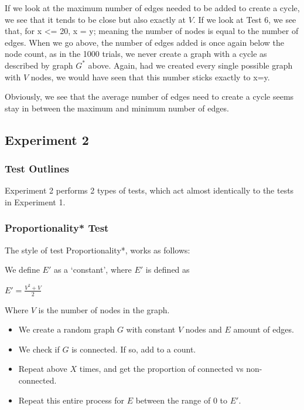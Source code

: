 \documentclass[12pt]{article}
\begin{document}
If we look at the maximum number of edges needed to be added to create a cycle, we see that it tends to be close but also exactly at $V$. If we look at Test 6, we see that, for x <= 20, x = y; meaning the number of nodes is equal to the number of edges. When we go above, the number of edges added is once again below the node count, as in the 1000 trials, we never create a graph with a cycle as described by graph $G^{*}$ above. Again, had we created every single possible graph with $V$ nodes, we would have seen that this number sticks exactly to x=y.

Obviously, we see that the average number of edges need to create a cycle seems stay in between the maximum and minimum number of edges.

%
%
%
%
\newpage
\subsection{Experiment 2}


\subsubsection{Test Outlines}

Experiment 2 performs 2 types of tests, which act almost identically to the tests in Experiment 1.

\subsubsection*{Proportionality* Test}
The style of test Proportionality*, works as follows:

We define $E'$ as a `constant', where $E'$ is defined as
\begin{center}
    $E' = \frac{V^2 + V}{2}$
\end{center}

Where $V$ is the number of nodes in the graph.

\begin{itemize}
    \item We create a random graph $G$ with constant $V$ nodes and $E$ amount of edges.
    \item We check if $G$ is connected. If so, add to a count.
    \item Repeat above $X$ times, and get the proportion of connected vs non-connected.
    \item Repeat this entire process for $E$ between the range of 0 to $E'$.
\end{itemize}
\end{document}
